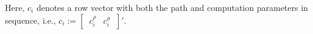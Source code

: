 \documentclass[letterpaper,10pt,conference,twoside]{IEEEtran}
\theoremstyle{definition}
\begin{document}
Here, $c_i$ denotes a row vector with both the path and computation parameters in sequence, i.e., $c_i:=[\begin{matrix}\,c_i^\rho & c_i^\sigma\,\end{matrix}]'$. %






\end{document}
